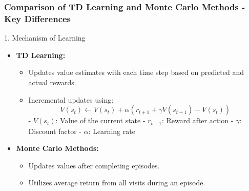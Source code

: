 \documentclass[aspectratio=169]{beamer}
\begin{document}
\begin{frame}[fragile]
    \frametitle{Comparison of TD Learning and Monte Carlo Methods - Key Differences}
    \begin{block}{1. Mechanism of Learning}
        \begin{itemize}
            \item \textbf{TD Learning:}
                \begin{itemize}
                    \item Updates value estimates with each time step based on predicted and actual rewards.
                    \item Incremental updates using:
                    \begin{equation}
                        V(s_t) \leftarrow V(s_t) + \alpha ( r_{t+1} + \gamma V(s_{t+1}) - V(s_t) )
                    \end{equation}
                    - $V(s_t)$: Value of the current state
                    - $r_{t+1}$: Reward after action
                    - $\gamma$: Discount factor
                    - $\alpha$: Learning rate
                \end{itemize}
            \item \textbf{Monte Carlo Methods:}
                \begin{itemize}
                    \item Updates values after completing episodes.
                    \item Utilizes average return from all visits during an episode.
                \end{itemize}
        \end{itemize}
    \end{block}
\end{frame}
\end{document}
